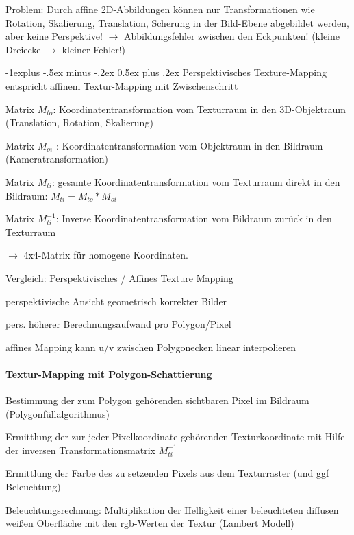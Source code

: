 \documentclass[landscape]{article}
\makeatletter
\renewcommand{\subsection}{\@startsection{subsection}{2}{0mm}%
                                {-1explus -.5ex minus -.2ex}%
                                {0.5ex plus .2ex}%
                                {\normalfont\normalsize\bfseries}}
\makeatother
\begin{document}
\begin{multicols}{3}
  Problem: Durch affine 2D-Abbildungen können nur Transformationen wie Rotation, Skalierung, Translation, Scherung in der Bild-Ebene abgebildet werden, aber keine Perspektive! $\rightarrow$ Abbildungsfehler zwischen den Eckpunkten! (kleine Dreiecke $\rightarrow$ kleiner Fehler!)
  
  \subsection{Perspektivisches Texture-Mapping}
  entspricht affinem Textur-Mapping mit Zwischenschritt
  \begin{itemize*}
    \item Matrix $M_{to}$: Koordinatentransformation vom Texturraum in den 3D-Objektraum (Translation, Rotation, Skalierung)
    \item Matrix $M_{oi}$ : Koordinatentransformation vom Objektraum in den Bildraum (Kameratransformation)
    \item Matrix $M_{ti}$: gesamte Koordinatentransformation vom Texturraum direkt in den Bildraum: $M_{ti} = M_{to}*M_{oi}$
    \item Matrix $M_{ti}^{-1}$: Inverse Koordinatentransformation vom Bildraum zurück in den Texturraum
  \end{itemize*}
  
  $\rightarrow$ 4x4-Matrix für homogene Koordinaten.
  
  Vergleich: Perspektivisches / Affines Texture Mapping
  \begin{itemize*}
    \item perspektivische Ansicht geometrisch korrekter Bilder
    \item pers. höherer Berechnungsaufwand pro Polygon/Pixel
    \item affines Mapping kann u/v zwischen Polygonecken linear interpolieren
  \end{itemize*}
  
  \paragraph{Textur-Mapping mit Polygon-Schattierung}
  \begin{itemize*}
    \item Bestimmung der zum Polygon gehörenden sichtbaren Pixel im Bildraum (Polygonfüllalgorithmus)
    \item Ermittlung der zur jeder Pixelkoordinate gehörenden Texturkoordinate mit Hilfe der inversen Transformationsmatrix $M_{ti}^{-1}$
    \item Ermittlung der Farbe des zu setzenden Pixels aus dem Texturraster (und ggf Beleuchtung)
    \item Beleuchtungsrechnung: Multiplikation der Helligkeit einer beleuchteten diffusen weißen Oberfläche mit den rgb-Werten der Textur (Lambert Modell)
  \end{itemize*}
  

\end{multicols}
\end{document}
